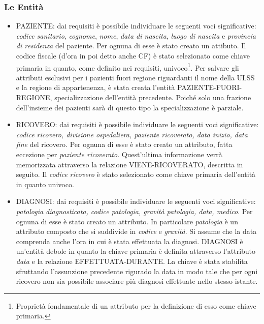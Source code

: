 \documentclass{article}
\begin{document}
\subsubsection{Le Entità} %
    \begin{itemize}
        \item PAZIENTE: dai requisiti è possibile individuare le seguenti voci
              significative: \textit{codice sanitario}, \textit{cognome},
              \textit{nome}, \textit{data di nascita}, \textit{luogo di nascita} e
              \textit{provincia di residenza} del paziente.
              Per ognuna di esse è stato creato un attibuto. Il codice fiscale
              (d'ora in poi detto anche CF) è stato selezionato come chiave
              primaria in quanto,
              come definito nei requisiti, univoco\footnote{Proprietà fondamentale
              di un attributo per la definizione di esso come chiave primaria.}.
              Per salvare gli attributi esclusivi per i pazienti fuori regione
              riguardanti il nome della ULSS e la regione di appartenenza, è stata
              creata l'entità PAZIENTE-FUORI-REGIONE, specializzazione dell'entità
              precedente.  Poiché solo una frazione dell'insieme dei pazienti sarà
              di questo tipo la specializzazione è parziale.
      
        \item RICOVERO: dai requisiti è possibile individuare le seguenti voci 
              significative: \textit{codice ricovero, divisione ospedaliera, 
              paziente ricoverato, data inizio, data fine} del ricovero. Per 
              ognuna di esse è stato creato un attributo, fatta eccezione per 
              \textit{paziente ricoverato}. Quest'ultima informazione verrà
              memorizzata attraverso la relazione VIENE-RICOVERATO, descritta 
              in seguito. Il \textit{codice ricovero} è stato selezionato come
              chiave primaria dell'entità in quanto univoco.
              
        \item DIAGNOSI: dai requisiti è possibile individuare le seguenti voci 
              significative: \textit{patologia diagnosticata, codice patologia,
              gravità patologia, data, medico}. Per ognuna di esse è stato 
              creato un attributo. In particolare \textit{patologia} è un 
              attributo composto che si suddivide in \textit{codice} e 
              \textit{gravità}. Si assume che la data comprenda anche l'ora in 
              cui è stata effettuata la diagnosi. DIAGNOSI è un'entità debole 
              in quanto la chiave primaria è definita attraverso l'attributo
              \textit{data} e la relazione EFFETTUATA-DURANTE. La chiave è
              stata stabilita sfruttando l'assunzione precedente rigurado la 
              data in modo tale che per ogni ricovero non sia possibile 
              associare più diagnosi effettuate nello stesso istante. 


\end{itemize}
\end{document}
